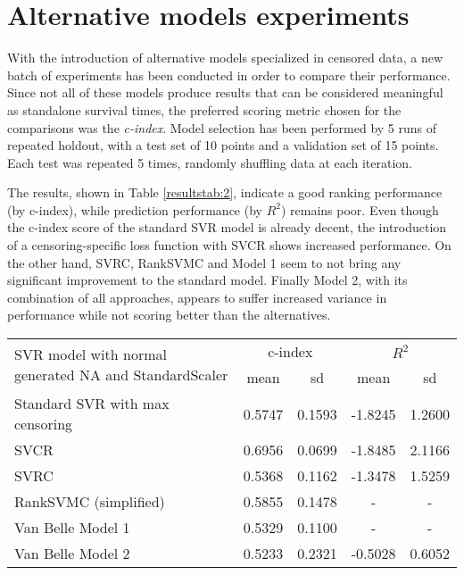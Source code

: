 \documentclass[12pt]{report}
\begin{document}
\section{Alternative models experiments}

With the introduction of alternative models specialized in censored data, a new batch of experiments has been conducted in order to compare their performance. Since not all of these models produce results that can be considered meaningful as standalone survival times, the preferred scoring metric chosen for the comparisons was the \textit{c-index}. Model selection has been performed by 5 runs of repeated holdout, with a test set of 10 points and a validation set of 15 points. Each test was repeated 5 times, randomly shuffling data at each iteration.

The results, shown in Table \ref{resultstab:2}, indicate a good ranking performance (by c-index), while prediction performance (by $R^2$) remains poor. Even though the c-index score of the standard SVR model is already decent, the introduction of a censoring-specific loss function with SVCR shows increased performance. On the other hand, SVRC, RankSVMC and Model 1 seem to not bring any significant improvement to the standard model. Finally Model 2, with its combination of all approaches, appears to suffer increased variance in performance while not scoring better than the alternatives.

\begin{center}
 \begin{tabular}{ |m{7cm}|c|c|c|c| }
\hline
\multirow{2}{=}{SVR model with normal generated NA and StandardScaler} & \multicolumn{2}{|c|}{c-index} & \multicolumn{2}{|c|}{$R^2$} \\ \cline{2-5}
& mean & sd & mean & sd \\ \hline
Standard SVR with max censoring & 0.5747 & 0.1593 & -1.8245 & 1.2600 \\ \hline
SVCR & 0.6956 & 0.0699 & -1.8485 & 2.1166 \\ \hline
SVRC & 0.5368 & 0.1162 & -1.3478 & 1.5259 \\ \hline
RankSVMC (simplified) & 0.5855 & 0.1478 & - & - \\ \hline
Van Belle Model 1 & 0.5329 & 0.1100 & - & - \\ \hline
Van Belle Model 2 & 0.5233 & 0.2321 & -0.5028 & 0.6052 \\ \hline
\end{tabular}
\label{resultstab:2}
\end{center} 
\end{document}

